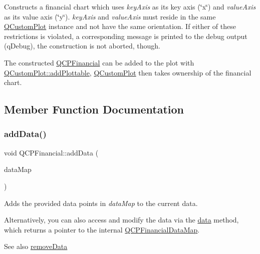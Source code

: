 Constructs a financial chart which uses {\itshape key\+Axis} as its key axis (\char`\"{}x\char`\"{}) and {\itshape value\+Axis} as its value axis (\char`\"{}y\char`\"{}). {\itshape key\+Axis} and {\itshape value\+Axis} must reside in the same \mbox{\hyperlink{class_q_custom_plot}{Q\+Custom\+Plot}} instance and not have the same orientation. If either of these restrictions is violated, a corresponding message is printed to the debug output (q\+Debug), the construction is not aborted, though.

The constructed \mbox{\hyperlink{class_q_c_p_financial}{Q\+C\+P\+Financial}} can be added to the plot with \mbox{\hyperlink{class_q_custom_plot_ab7ad9174f701f9c6f64e378df77927a6}{Q\+Custom\+Plot\+::add\+Plottable}}, \mbox{\hyperlink{class_q_custom_plot}{Q\+Custom\+Plot}} then takes ownership of the financial chart. 

\subsection{Member Function Documentation}
\mbox{\label{class_q_c_p_financial_a1a83396f97fcc68f2b7aa8d9782feffe}} 
\subsubsection{\texorpdfstring{add\+Data()}{addData()}\hspace{0.1cm}{\footnotesize\ttfamily [1/4]}}
{\footnotesize\ttfamily void Q\+C\+P\+Financial\+::add\+Data (\begin{DoxyParamCaption}\item[{const \mbox{\hyperlink{qcustomplot_8h_a745c09823fae0974b50beca9bc3b3d7d}{Q\+C\+P\+Financial\+Data\+Map}} \&}]{data\+Map }\end{DoxyParamCaption})}

Adds the provided data points in {\itshape data\+Map} to the current data.

Alternatively, you can also access and modify the data via the \mbox{\hyperlink{class_q_c_p_financial_a528c81578e4f25999a9169127763cfd4}{data}} method, which returns a pointer to the internal \mbox{\hyperlink{qcustomplot_8h_a745c09823fae0974b50beca9bc3b3d7d}{Q\+C\+P\+Financial\+Data\+Map}}.

\begin{DoxySeeAlso}{See also}
\mbox{\hyperlink{class_q_c_p_financial_a048c741d3c8cc5709c2c44b759fdf27c}{remove\+Data}} 
\end{DoxySeeAlso}
\mbox{\label{class_q_c_p_financial_a3b6144b48a6a8e63236fc5bf70d40c00}} 
